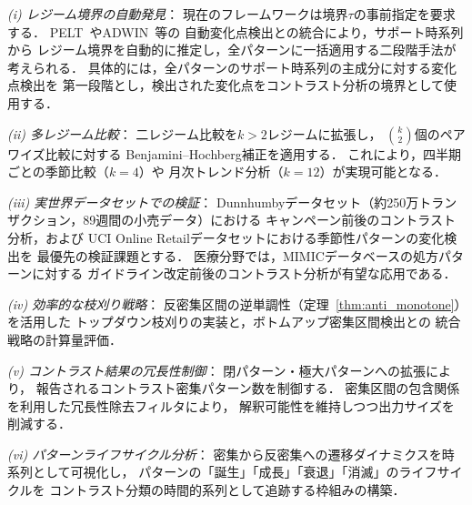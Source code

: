 \emph{(i) レジーム境界の自動発見}：
現在のフレームワークは境界$\tau$の事前指定を要求する．
PELT~\cite{killick2012pelt}やADWIN~\cite{bifet2007adwin}等の
自動変化点検出との統合により，サポート時系列から
レジーム境界を自動的に推定し，全パターンに一括適用する二段階手法が考えられる．
具体的には，全パターンのサポート時系列の主成分に対する変化点検出を
第一段階とし，検出された変化点をコントラスト分析の境界として使用する．

\emph{(ii) 多レジーム比較}：
二レジーム比較を$k > 2$レジームに拡張し，
$\binom{k}{2}$個のペアワイズ比較に対する
Benjamini--Hochberg補正を適用する．
これにより，四半期ごとの季節比較（$k = 4$）や
月次トレンド分析（$k = 12$）が実現可能となる．

\emph{(iii) 実世界データセットでの検証}：
Dunnhumbyデータセット（約250万トランザクション，89週間の小売データ）における
キャンペーン前後のコントラスト分析，および
UCI Online Retailデータセットにおける季節性パターンの変化検出を
最優先の検証課題とする．
医療分野では，MIMICデータベースの処方パターンに対する
ガイドライン改定前後のコントラスト分析が有望な応用である．

\emph{(iv) 効率的な枝刈り戦略}：
反密集区間の逆単調性（定理~\ref{thm:anti_monotone}）を活用した
トップダウン枝刈りの実装と，ボトムアップ密集区間検出との
統合戦略の計算量評価．

\emph{(v) コントラスト結果の冗長性制御}：
閉パターン・極大パターンへの拡張により，
報告されるコントラスト密集パターン数を制御する．
密集区間の包含関係を利用した冗長性除去フィルタにより，
解釈可能性を維持しつつ出力サイズを削減する．

\emph{(vi) パターンライフサイクル分析}：
密集から反密集への遷移ダイナミクスを時系列として可視化し，
パターンの「誕生」「成長」「衰退」「消滅」のライフサイクルを
コントラスト分類の時間的系列として追跡する枠組みの構築．
